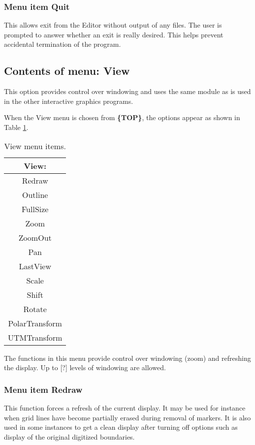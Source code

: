 \documentclass{article}
\begin{document}

\subsubsection[Menu item Quit]{Menu item Quit}
This allows exit from the Editor without output of any files. The user is prompted to answer whether an exit is really desired. This helps prevent accidental termination of the program.


\subsection{Contents of menu: View}
This option provides control over windowing and uses the same module as is used in the other interactive graphics programs.

When the View menu is chosen from \textbf{\{TOP\}}, the options appear as shown in Table \ref{tab:VIEW}.

\begin{table}[htb!]
 \caption{View menu items.}
  \begin{center}
   \begin{tabular}{|c|}
    \hline
View:\\     \hline
Redraw \\ Outline \\    \hline
FullSize \\ Zoom \\ ZoomOut \\ Pan \\ LastView \\    \hline
Scale \\ Shift \\ Rotate \\    \hline
PolarTransform \\  UTMTransform \\
    \hline
   \end{tabular}
   \label{tab:VIEW}
  \end{center}
\end{table}


The functions in this menu provide control over windowing (zoom) and refreshing the display. Up to [?] levels of windowing are allowed.

\subsubsection{Menu item Redraw}
This function forces a refresh of the current display. It may be used for instance when grid lines have become partially erased during removal of markers. It is also used in some instances to get a clean display after turning off options such as display of the original digitized boundaries.
\end{document}
